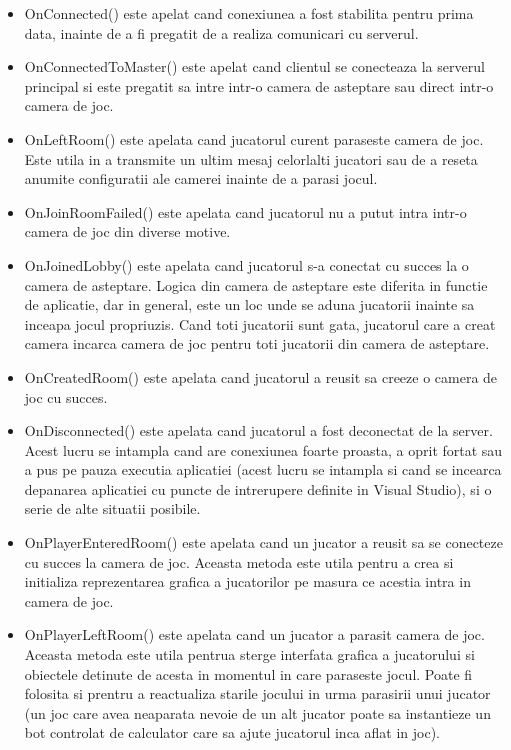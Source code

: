 \documentclass[12pt, a4paper]{article}
\begin{document}
	\begin{itemize}
		\item OnConnected() este apelat cand conexiunea a fost stabilita pentru prima data, inainte de a fi pregatit de a realiza comunicari cu serverul.
		\item OnConnectedToMaster() este apelat cand clientul se conecteaza la serverul principal si este pregatit sa intre intr-o camera de asteptare sau direct intr-o camera de joc.
		\item OnLeftRoom() este apelata cand jucatorul curent paraseste camera de joc. Este utila in a transmite un ultim mesaj celorlalti jucatori sau de a reseta anumite configuratii ale camerei inainte de a parasi jocul.
		\item OnJoinRoomFailed() este apelata cand jucatorul nu a putut intra intr-o camera de joc din diverse motive.
		\item OnJoinedLobby() este apelata cand jucatorul s-a conectat cu succes la o camera de asteptare. Logica din camera de asteptare este diferita in functie de aplicatie, dar in general, este un loc unde se aduna jucatorii inainte sa inceapa jocul propriuzis. Cand toti jucatorii sunt gata, jucatorul care a creat camera incarca camera de joc pentru toti jucatorii din camera de asteptare.
		\item OnCreatedRoom() este apelata cand jucatorul a reusit sa creeze o camera de joc cu succes.
		\item OnDisconnected() este apelata cand jucatorul a fost deconectat de la server. Acest lucru se intampla cand are conexiunea foarte proasta, a oprit fortat sau a pus pe pauza executia aplicatiei (acest lucru se intampla si cand se incearca depanarea aplicatiei cu puncte de intrerupere definite in Visual Studio), si o serie de alte situatii posibile.
		\item OnPlayerEnteredRoom() este apelata cand un jucator a reusit sa se conecteze cu succes la camera de joc. Aceasta metoda este utila pentru a crea si initializa reprezentarea grafica a jucatorilor pe masura ce acestia intra in camera de joc.
		\item OnPlayerLeftRoom() este apelata cand un jucator a parasit camera de joc. Aceasta metoda este utila pentrua sterge interfata grafica a jucatorului si obiectele detinute de acesta in momentul in care paraseste jocul. Poate fi folosita si prentru a reactualiza starile jocului in urma parasirii unui jucator (un joc care avea neaparata nevoie de un alt jucator poate sa instantieze un bot controlat de calculator care sa ajute jucatorul inca aflat in joc).
	\end{itemize}
\end{document}
